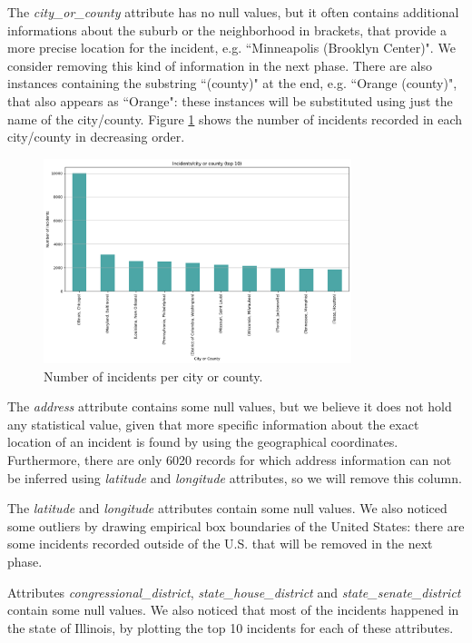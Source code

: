 \documentclass[11pt,a4paper]{report}
\begin{document}
The \textit{city\_or\_county} attribute has no null values, but it often contains additional informations about the suburb or the neighborhood in brackets, that provide a more precise location for the incident, e.g. ``Minneapolis (Brooklyn Center)".
We consider removing this kind of information in the next phase.
There are also instances containing the substring ``(county)" at the end, e.g. ``Orange (county)", that also appears as ``Orange": these instances will be substituted using just the name of the city/county.
Figure \ref{incidents_per_citycounty} shows the number of incidents recorded in each city/county in decreasing order.
\begin{figure}[H]
	\includegraphics[width=0.8\textwidth]{incidents_per_citycounty}
	\centering
	\caption{Number of incidents per city or county.}
	\label{incidents_per_citycounty}
\end{figure}

The \textit{address} attribute contains some null values, but we believe it does not hold any statistical value, given that more specific information about the exact location of an incident is found by using the geographical coordinates.
Furthermore, there are only 6020 records for which address information can not be inferred using \textit{latitude} and \textit{longitude} attributes, so we will remove this column.

The \textit{latitude} and \textit{longitude} attributes contain some null values.
We also noticed some outliers by drawing empirical box boundaries of the United States: there are some incidents recorded outside of the U.S. that will be removed in the next phase.

Attributes \textit{congressional\_district}, \textit{state\_house\_district} and \textit{state\_senate\_district} contain some null values.
We also noticed that most of the incidents happened in the state of Illinois, by plotting the top 10 incidents for each of these attributes.
\end{document}
